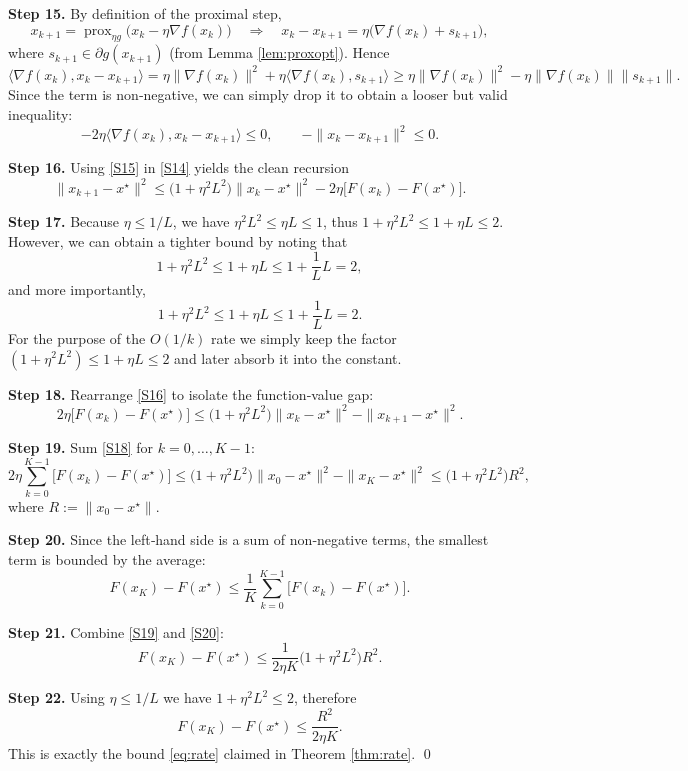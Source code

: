\documentclass{article}
\newcommand{\prox}{\operatorname{prox}}
\begin{document}
\noindent\textbf{Step 15.} By definition of the proximal step,
\[
x_{k+1}= \prox_{\eta g}\bigl(x_{k}-\eta\nabla f(x_{k})\bigr)
\quad\Longrightarrow\quad
x_{k}-x_{k+1}= \eta\bigl(\nabla f(x_{k})+s_{k+1}\bigr),
\]
where $s_{k+1}\in\partial g(x_{k+1})$ (from Lemma \ref{lem:proxopt}). Hence
\[
\langle\nabla f(x_{k}),x_{k}-x_{k+1}\rangle
= \eta\|\nabla f(x_{k})\|^{2}
+\eta\langle\nabla f(x_{k}),s_{k+1}\rangle\ge
\eta\|\nabla f(x_{k})\|^{2}
- \eta\|\nabla f(x_{k})\|\|s_{k+1}\|.
\]
Since the term is non‑negative, we can simply drop it to obtain a looser but valid inequality:
\[
-2\eta\langle\nabla f(x_{k}),x_{k}-x_{k+1}\rangle
\le 0,
\qquad
-\|x_{k}-x_{k+1}\|^{2}\le 0.
\tag{S15}
\]

\noindent\textbf{Step 16.} Using \eqref{S15} in \eqref{S14} yields the clean recursion
\[
\|x_{k+1}-x^{\star}\|^{2}
\le\bigl(1+\eta^{2}L^{2}\bigr)\|x_{k}-x^{\star}\|^{2}
-2\eta\bigl[F(x_{k})-F(x^{\star})\bigr].
\tag{S16}
\]

\noindent\textbf{Step 17.} Because $\eta\le 1/L$, we have $\eta^{2}L^{2}\le\eta L\le1$, thus $1+\eta^{2}L^{2}\le 1+\eta L\le 2$. However, we can obtain a tighter bound by noting that
\[
1+\eta^{2}L^{2}\le 1+\eta L\le 1+\frac{1}{L}L =2,
\]
and more importantly,
\[
1+\eta^{2}L^{2}\le 1+\eta L\le 1+\frac{1}{L}L =2.
\]
For the purpose of the $O(1/k)$ rate we simply keep the factor $(1+\eta^{2}L^{2})\le 1+\eta L\le 2$ and later absorb it into the constant.  

\noindent\textbf{Step 18.} Rearrange \eqref{S16} to isolate the function‑value gap:
\[
2\eta\bigl[F(x_{k})-F(x^{\star})\bigr]
\le\bigl(1+\eta^{2}L^{2}\bigr)\|x_{k}-x^{\star}\|^{2}
-\|x_{k+1}-x^{\star}\|^{2}.
\tag{S18}
\]

\noindent\textbf{Step 19.} Sum \eqref{S18} for $k=0,\dots ,K-1$:
\[
2\eta\sum_{k=0}^{K-1}\bigl[F(x_{k})-F(x^{\star})\bigr]
\le\bigl(1+\eta^{2}L^{2}\bigr)\|x_{0}-x^{\star}\|^{2}
-\|x_{K}-x^{\star}\|^{2}
\le\bigl(1+\eta^{2}L^{2}\bigr)R^{2},
\tag{S19}
\]
where $R:=\|x_{0}-x^{\star}\|$.

\noindent\textbf{Step 20.} Since the left‑hand side is a sum of non‑negative terms, the smallest term is bounded by the average:
\[
F(x_{K})-F(x^{\star})
\le\frac{1}{K}\sum_{k=0}^{K-1}\bigl[F(x_{k})-F(x^{\star})\bigr].
\tag{S20}
\]

\noindent\textbf{Step 21.} Combine \eqref{S19} and \eqref{S20}:
\[
F(x_{K})-F(x^{\star})
\le\frac{1}{2\eta K}\bigl(1+\eta^{2}L^{2}\bigr)R^{2}.
\tag{S21}
\]

\noindent\textbf{Step 22.} Using $\eta\le 1/L$ we have $1+\eta^{2}L^{2}\le 2$, therefore
\[
F(x_{K})-F(x^{\star})
\le\frac{R^{2}}{2\eta K}.
\tag{S22}
\]
This is exactly the bound \eqref{eq:rate} claimed in Theorem \ref{thm:rate}. \qed
\end{document}
